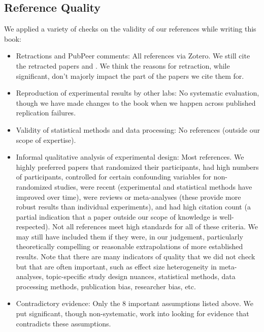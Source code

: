 \documentclass[12pt,letterpaper]{book}
\begin{document}
\subsection*{Reference Quality}
We applied a variety of checks on the validity of our references while writing this book:
\begin{itemize}
    \item Retractions and PubPeer comments: All references via Zotero. We still cite the retracted papers \textcite{jeromeMDMALongTerm} and \textcite{feducciaSSRIDiscontinuation}. We think the reasons for retraction, while significant, don't majorly impact the part of the papers we cite them for.
    \item Reproduction of experimental results by other labs: No systematic evaluation, though we have made changes to the book when we happen across published replication failures.
    \item Validity of statistical methods and data processing: No references (outside our scope of expertise).
    \item Informal qualitative analysis of experimental design: Most references. We highly preferred papers that randomized their participants, had high numbers of participants, controlled for certain confounding variables for non-randomized studies, were recent (experimental and statistical methods have improved over time), were reviews or meta-analyses (these provide more robust results than individual experiments), and had high citation count (a partial indication that a paper outside our scope of knowledge is well-respected). Not all references meet high standards for all of these criteria. We may still have included them if they were, in our judgement, particularly theoretically compelling or reasonable extrapolations of more established results. Note that there are many indicators of quality that we did not check but that are often important, such as effect size heterogeneity in meta-analyses, topic-specific study design nuances, statistical methods, data processing methods, publication bias, researcher bias, etc.
    \item Contradictory evidence: Only the 8 important assumptions listed above. We put significant, though non-systematic, work into looking for evidence that contradicts these assumptions.
\end{itemize}
\end{document}
